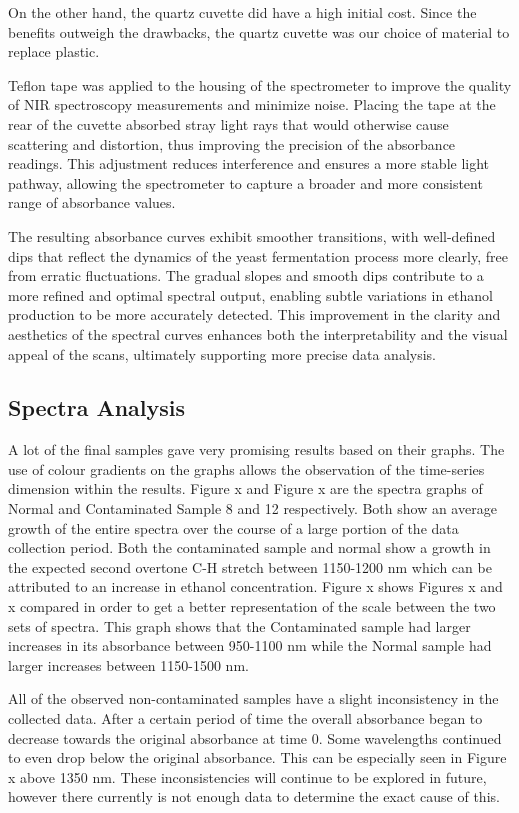 \documentclass[12pt]{report}
\begin{document}
On the other hand, the quartz cuvette did have a high initial cost. Since the benefits outweigh the drawbacks, the quartz cuvette was our choice of material to replace plastic.

Teflon tape was applied to the housing of the spectrometer to improve the quality of NIR spectroscopy measurements and minimize noise. Placing the tape at the rear of the cuvette absorbed stray light rays that would otherwise cause scattering and distortion, thus improving the precision of the absorbance readings. This adjustment reduces interference and ensures a more stable light pathway, allowing the spectrometer to capture a broader and more consistent range of absorbance values.

The resulting absorbance curves exhibit smoother transitions, with well-defined dips that reflect the dynamics of the yeast fermentation process more clearly, free from erratic fluctuations. The gradual slopes and smooth dips contribute to a more refined and optimal spectral output, enabling subtle variations in ethanol production to be more accurately detected. This improvement in the clarity and aesthetics of the spectral curves enhances both the interpretability and the visual appeal of the scans, ultimately supporting more precise data analysis.

\subsection{Spectra Analysis}

A lot of the final samples gave very promising results based on their graphs. The use of colour gradients on the graphs allows the observation of the time-series dimension within the results. Figure x and Figure x are the spectra graphs of Normal and Contaminated Sample 8 and 12 respectively. Both show an average growth of the entire spectra over the course of a large portion of the data collection period. Both the contaminated sample and normal show a growth in the expected second overtone C-H stretch between 1150-1200 nm which can be attributed to an increase in ethanol concentration. Figure x shows Figures x and x compared in order to get a better representation of the scale between the two sets of spectra. This graph shows that the Contaminated sample had larger increases in its absorbance between 950-1100 nm while the Normal sample had larger increases between 1150-1500 nm. 

All of the observed non-contaminated samples have a slight inconsistency in the collected data. After a certain period of time the overall absorbance began to decrease towards the original absorbance at time 0. Some wavelengths continued to even drop below the original absorbance. This can be especially seen in Figure x above 1350 nm. These inconsistencies will continue to be explored in future, however there currently is not enough data to determine the exact cause of this.
\end{document}
